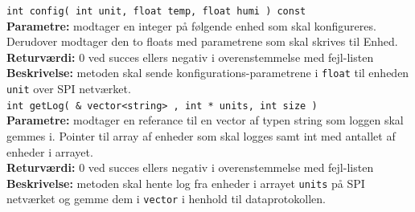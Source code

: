 \verb+int config( int unit, float temp, float humi ) const +\\
\textbf{Parametre:} modtager en integer på følgende enhed som skal konfigureres. Derudover modtager den to floats med parametrene som skal skrives til Enhed. \\
\textbf{Returværdi:}  0 ved succes ellers negativ i overenstemmelse med fejl-listen   \\
\textbf{Beskrivelse:} metoden skal sende konfigurations-parametrene i \verb+float+ til enheden \verb+unit+ over SPI netværket.\\

\verb+int getLog( & vector<string> , int * units, int size )+ \\
\textbf{Parametre:}  modtager en referance til en vector af typen string som loggen skal gemmes i. Pointer til array af enheder som skal logges samt int med antallet af enheder i arrayet. \\
\textbf{Returværdi:}  0 ved succes ellers negativ i overenstemmelse med fejl-listen   \\
\textbf{Beskrivelse:} metoden skal hente log fra enheder i arrayet \verb+units+ på SPI netværket og gemme dem i \verb+vector+ i henhold til dataprotokollen. \\
